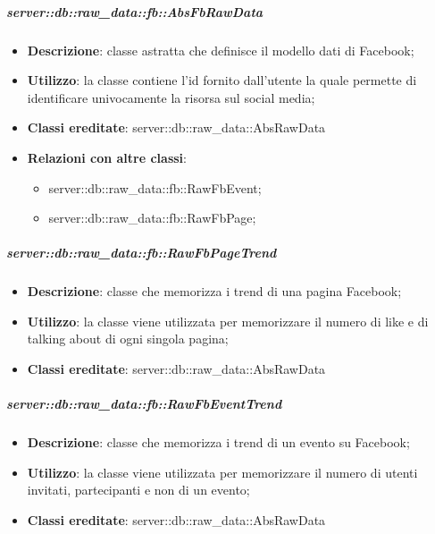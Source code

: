 		
		\subparagraph{server::db::raw\_data::fb::AbsFbRawData} %
		\label{subp:server_db_raw_data_fb_absfbrawdata}
			\begin{itemize}
				\item \textbf{Descrizione}: classe astratta che definisce il modello dati di Facebook;
				\item \textbf{Utilizzo}: la classe contiene l'id fornito dall'utente la quale permette di identificare univocamente la risorsa sul social media;
				\item \textbf{Classi ereditate}: server::db::raw\_data::AbsRawData
				\item \textbf{Relazioni con altre classi}:
					\begin{itemize}
						\item server::db::raw\_data::fb::RawFbEvent;
						\item server::db::raw\_data::fb::RawFbPage;
					\end{itemize}
			\end{itemize}


		\subparagraph{server::db::raw\_data::fb::RawFbPageTrend} %
		\label{subp:server_db_raw_data_fb_rowfbpagetrend}
			\begin{itemize}
				\item \textbf{Descrizione}: classe che memorizza i trend di una pagina Facebook;
				\item \textbf{Utilizzo}: la classe viene utilizzata per memorizzare il numero di like e di talking about di ogni singola pagina;
				\item \textbf{Classi ereditate}: server::db::raw\_data::AbsRawData
			\end{itemize}


		\subparagraph{server::db::raw\_data::fb::RawFbEventTrend} %
		\label{subp:server_db_raw_data_fb_rowfbeventtrend}
			\begin{itemize}
				\item \textbf{Descrizione}: classe che memorizza i trend di un evento su Facebook;
				\item \textbf{Utilizzo}: la classe viene utilizzata per memorizzare il numero di utenti invitati, partecipanti e non di un evento;
				\item \textbf{Classi ereditate}: server::db::raw\_data::AbsRawData
			\end{itemize}


